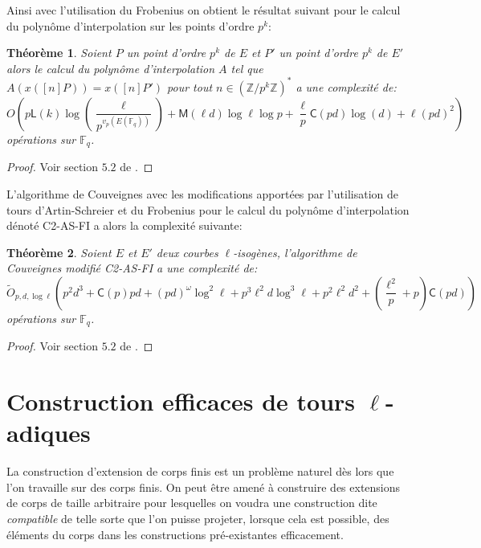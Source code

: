 \documentclass[10pt,a4paper]{book}
\theoremstyle{plain}
\newtheorem{thm}{Théorème}
\theoremstyle{definition}
\theoremstyle{definition}
\theoremstyle{definition}
\theoremstyle{definition}
\theoremstyle{remark}
\theoremstyle{remark}
\begin{document}
Ainsi avec l'utilisation du Frobenius on obtient le résultat suivant pour le calcul du polynôme d'interpolation sur les points d'ordre $p^k$:

\begin{thm}
Soient $P$ un point d'ordre $p^k$ de $E$ et $P'$ un point d'ordre $p^k$ de $E'$ alors le calcul du polynôme d'interpolation $A$ tel que $A(x([n]P))=x([n]P')$ pour tout $n \in \left( \mathbb{Z}/p^k \mathbb{Z} \right)^*$ a une complexité de:
\[
O(p\mathsf{L}(k)\log(\frac{\ell}{p^{v_p(E(\mathbb{F}_q))}})+\mathsf{M}(\ell d)\log \ell \log p + \frac{\ell}{p}\mathsf{C}(pd)\log(d)+\ell (pd)^2)
\]
opérations sur $\mathbb{F}_q$.
\end{thm}

\begin{proof}
Voir section $5.2$ de \cite{DeFeo11}.
\end{proof}

L'algorithme de Couveignes avec les modifications apportées par l'utilisation de tours d'Artin-Schreier et du Frobenius pour le calcul du polynôme d'interpolation dénoté C2-AS-FI a alors la complexité suivante:

\begin{thm}
Soient $E$ et $E'$ deux courbes $\ell$-isogènes, l'algorithme de Couveignes modifié C2-AS-FI a une complexité de:
\[
\tilde{O}_{p,d,\log \ell}(p^2d^3+\mathsf{C}(p)pd+(pd)^{\omega}\log^2 \ell + p^3 \ell^2 d \log^3 \ell + p^2\ell^2d^2+(\frac{\ell^2}{p}+p)\mathsf{C}(pd))
\]
opérations sur $\mathbb{F}_q$.
\end{thm}

\begin{proof}
Voir section $5.2$ de \cite{DeFeo11}.
\end{proof}

\chapter{Construction efficaces de tours $\ell$-adiques}
La construction d'extension de corps finis est un problème naturel dès lors que l'on travaille sur des corps finis. On peut être amené à construire des extensions de corps de taille arbitraire pour lesquelles on voudra une construction dite \textit{compatible} de telle sorte que l'on puisse projeter, lorsque cela est possible, des éléments du corps dans les constructions pré-existantes efficacement.
\end{document}
